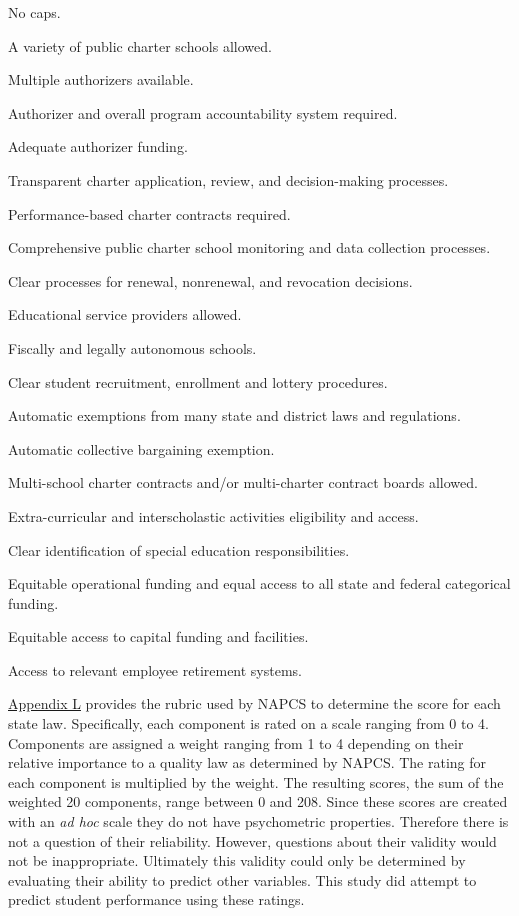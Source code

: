 \documentclass[letterpaper,12p,twoside]{article} %
\renewcommand{\normalsize}{\fontsize{12}{13}\selectfont}
\begin{document}
\begin{singlespace}\normalsize
\begin{enumerate}[noitemsep]
{\it
\item No caps.
\item A variety of public charter schools allowed.
\item Multiple authorizers available.
\item Authorizer and overall program accountability system required.
\item Adequate authorizer funding.
\item Transparent charter application, review, and decision-making processes.
\item Performance-based charter contracts required.
\item Comprehensive public charter school monitoring and data collection processes.
\item Clear processes for renewal, nonrenewal, and revocation decisions.
\item Educational service providers allowed.
\item Fiscally and legally autonomous schools.
\item Clear student recruitment, enrollment and lottery procedures.
\item Automatic exemptions from many state and district laws and regulations.
\item Automatic collective bargaining exemption.
\item Multi-school charter contracts and/or multi-charter contract boards allowed.
\item Extra-curricular and interscholastic activities eligibility and access.
\item Clear identification of special education responsibilities.
\item Equitable operational funding and equal access to all state and federal categorical funding.
\item Equitable access to capital funding and facilities.
\item Access to relevant employee retirement systems.
}
\end{enumerate}
\end{singlespace}

\noindent \hyperref[appendixL]{Appendix L} provides the rubric used by NAPCS to determine the score for each state law. Specifically, each component is rated on a scale ranging from 0 to 4. Components are assigned a weight ranging from 1 to 4 depending on their relative importance to a quality law as determined by NAPCS. The rating for each component is multiplied by the weight. The resulting scores, the sum of the weighted 20 components, range between 0 and 208. Since these scores are created with an \textit{ad hoc} scale they do not have psychometric properties. Therefore there is not a question of their reliability. However, questions about their validity would not be inappropriate. Ultimately this validity could only be determined by evaluating their ability to predict other variables. This study did attempt to predict student performance using these ratings.
\end{document}
